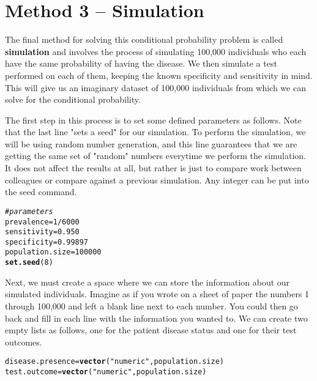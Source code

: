 \documentclass[11pt]{article}\usepackage[]{graphicx}\usepackage[]{color}
\makeatletter
\newcommand{\hlnum}[1]{\textcolor[rgb]{0.686,0.059,0.569}{#1}}%
\newcommand{\hlstr}[1]{\textcolor[rgb]{0.192,0.494,0.8}{#1}}%
\newcommand{\hlcom}[1]{\textcolor[rgb]{0.678,0.584,0.686}{\textit{#1}}}%
\newcommand{\hlopt}[1]{\textcolor[rgb]{0,0,0}{#1}}%
\newcommand{\hlstd}[1]{\textcolor[rgb]{0.345,0.345,0.345}{#1}}%
\newcommand{\hlkwb}[1]{\textcolor[rgb]{0.69,0.353,0.396}{#1}}%
\newcommand{\hlkwd}[1]{\textcolor[rgb]{0.737,0.353,0.396}{\textbf{#1}}}%
\newenvironment{kframe}{%
 \def\at@end@of@kframe{}%
 \ifinner\ifhmode%
  \def\at@end@of@kframe{\end{minipage}}%
  \begin{minipage}{\columnwidth}%
 \fi\fi%
 \def\FrameCommand##1{\hskip\@totalleftmargin \hskip-\fboxsep
 \colorbox{shadecolor}{##1}\hskip-\fboxsep
     \hskip-\linewidth \hskip-\@totalleftmargin \hskip\columnwidth}%
 \MakeFramed {\advance\hsize-\width
   \@totalleftmargin\z@ \linewidth\hsize
   \@setminipage}}%
 {\par\unskip\endMakeFramed%
 \at@end@of@kframe}
\newenvironment{knitrout}{}{} %
\makeatother
\begin{document}
\section{Method 3 -- Simulation}
The final method for solving this conditional probability problem is called \textbf{simulation} and involves the process of simulating 100,000 individuals who each have the same probability of having the disease.  We then simulate a test performed on each of them, keeping the known specificity and sensitivity in mind.  This will give us an imaginary dataset of 100,000 individuals from which we can solve for the conditional probability.  

The first step in this process is to set some defined parameters as follows.  Note that the last line "sets a seed" for our simulation.  To perform the simulation, we will be using random number generation, and this line guarantees that we are getting the same set of "random" numbers everytime we perform the simulation.  It does not affect the results at all, but rather is just to compare work between colleagues or compare against a previous simulation. Any integer can be put into the seed command.   
\begin{knitrout}
\color{fgcolor}\begin{kframe}
\begin{alltt}
\hlcom{#parameters}
\hlstd{prevalence} \hlkwb{=} \hlnum{1}\hlopt{/}\hlnum{6000}
\hlstd{sensitivity} \hlkwb{=} \hlnum{0.950}
\hlstd{specificity} \hlkwb{=} \hlnum{0.99897}
\hlstd{population.size} \hlkwb{=} \hlnum{100000}
\hlkwd{set.seed}\hlstd{(}\hlnum{8}\hlstd{)}
\end{alltt}
\end{kframe}
\end{knitrout}

Next, we must create a space where we can store the information about our simulated individuals.  Imagine as if you wrote on a sheet of paper the numbers 1 through 100,000 and left a blank line next to each number.  You could then go back and fill in each line with the information you wanted to.  We can create two empty lists as follows, one for the patient disease status and one for their test outcomes.  
\begin{knitrout}
\color{fgcolor}\begin{kframe}
\begin{alltt}
\hlstd{disease.presence} \hlkwb{=} \hlkwd{vector}\hlstd{(}\hlstr{"numeric"}\hlstd{, population.size)}
\hlstd{test.outcome} \hlkwb{=} \hlkwd{vector}\hlstd{(}\hlstr{"numeric"}\hlstd{, population.size)}
\end{alltt}
\end{kframe}
\end{knitrout}
\end{document}
